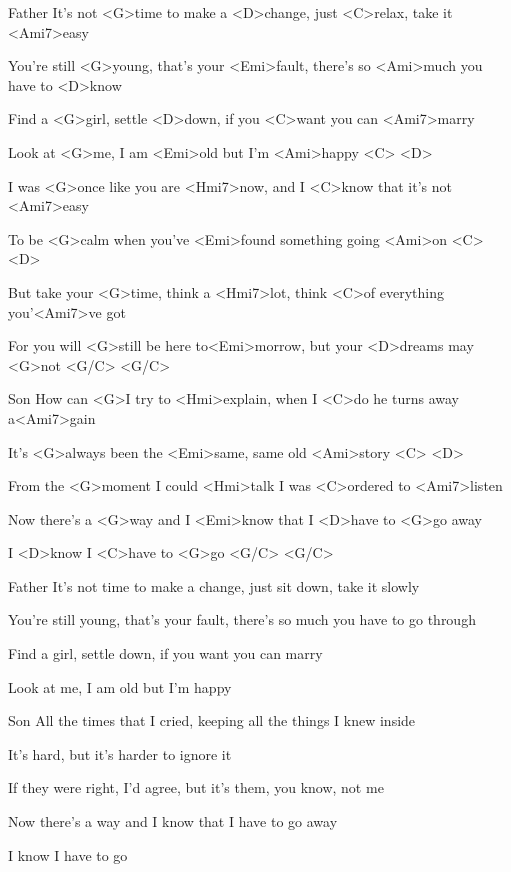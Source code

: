 

Father
\zs
It's not <G>time to make a <D>change, just <C>relax, take it <Ami7>easy

You're still <G>young, that's your <Emi>fault, there's so <Ami>much you have to <D>know

Find a <G>girl, settle <D>down, if you <C>want you can <Ami7>marry

Look at <G>me, I am <Emi>old but I'm <Ami>happy <C> <D>
\ks

\zs
I was <G>once like you are <Hmi7>now, and I <C>know that it's not <Ami7>easy

To be <G>calm when you've <Emi>found something going <Ami>on <C> <D>

But take your <G>time, think a <Hmi7>lot, think <C>of everything you'<Ami7>ve got

For you will <G>still be here to<Emi>morrow, but your <D>dreams may <G>not <G/C> <G/C>
\ks

Son
\zs
How can <G>I try to <Hmi>explain, when I <C>do he turns away a<Ami7>gain

It's <G>always been the <Emi>same, same old <Ami>story <C> <D>

From the <G>moment I could <Hmi>talk I was <C>ordered to <Ami7>listen

Now there's a <G>way and I <Emi>know that I <D>have to <G>go away

I <D>know I <C>have to <G>go <G/C> <G/C>
\ks

Father
\zs
It's not time to make a change, just sit down, take it slowly

You're still young, that's your fault, there's so much you have to go through

Find a girl, settle down, if you want you can marry

Look at me, I am old but I'm happy
\ks

Son
\zs
All the times that I cried, keeping all the things I knew inside

It's hard, but it's harder to ignore it

If they were right, I'd agree, but it's them, you know, not me

Now there's a way and I know that I have to go away

I know I have to go
\ks

\kp
